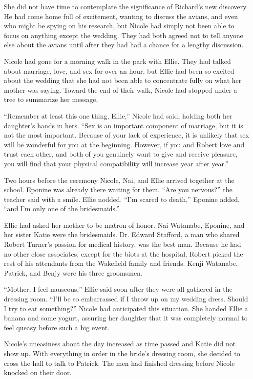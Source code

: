 \documentclass[]{article}
\begin{document}
{She did not have time to contemplate the significance of Richard’s new discovery. He had come home full of excitement, wanting to discuss the avians, and even who might be spying on his research, but Nicole had simply not been able to focus on anything except the wedding. They had both agreed not to tell anyone else about the avians until after they had had a chance for a lengthy discussion.

Nicole had gone for a morning walk in the park with Ellie. They had talked about marriage, love, and sex for over an hour, but Ellie had been so excited about the wedding that she had not been able to concentrate fully on what her mother was saying. Toward the end of their walk, Nicole had stopped under a tree to summarize her message,

“Remember at least this one thing, Ellie,” Nicole had said, holding both her daughter’s hands in hers. “Sex is an important component of marriage, but it is not the most important. Because of your lack of experience, it is unlikely that sex will be wonderful for you at the beginning. However, if you and Robert love and trust each other, and both of you genuinely want to give and receive pleasure, you will find that your physical compatibility will increase year after year.”

Two hours before the ceremony Nicole, Nai, and Ellie arrived together at the school. Eponine was already there waiting for them. “Are you nervous?” the teacher said with a smile. Ellie nodded. “I’m scared to death,” Eponine added, “and I’m only one of the bridesmaids.”

Ellie had asked her mother to be matron of honor. Nai Watanabe, Eponine, and her sister Katie were the bridesmaids. Dr. Edward Stafford, a man who shared Robert Turner’s passion for medical history, was the best man. Because he had no other close associates, except for the biots at the hospital, Robert picked the rest of his attendants from the Wakefield family and friends. Kenji Watanabe, Patrick, and Benjy were his three groomsmen.

“Mother, I feel nauseous,” Ellie said soon after they were all gathered in the dressing room. “I’ll be so embarrassed if I throw up on my wedding dress. Should I try to eat something?” Nicole had anticipated this situation. She handed Ellie a banana and some yogurt, assuring her daughter that it was completely normal to feel queasy before such a big event.

Nicole’s uneasiness about the day increased as time passed and Katie did not show up. With everything in order in the bride’s dressing room, she decided to cross the hall to talk to Patrick. The men had finished dressing before Nicole knocked on their door.

}
\end{document}
